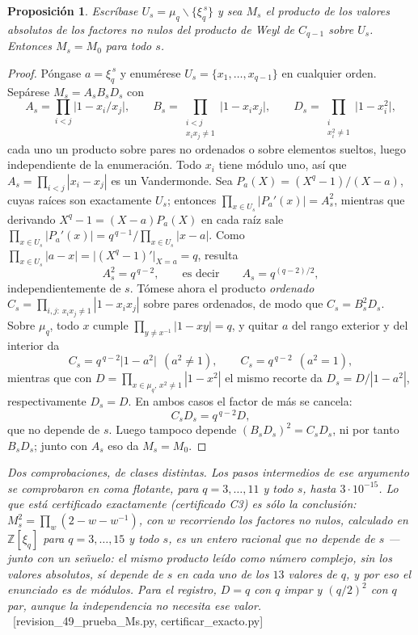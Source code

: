 \documentclass[11pt,a4paper]{article}
\newtheorem{proposition}[theorem]{Proposición}
\newcommand{\ver}[1]{\unskip\penalty0\ \textcolor{azul}{\small\textsf{[#1]}}}
\begin{document}
\begin{proposition}\label{prop:Ms}
Escríbase $U_s=\mu_q\smallsetminus\{\xi_q^{\,s}\}$ y sea $M_s$ el producto de los \emph{valores
absolutos} de los factores no nulos del producto de Weyl de $C_{q-1}$ sobre $U_s$. Entonces
$M_s=M_0$ para todo $s$.
\end{proposition}

\begin{proof}
Póngase $a=\xi_q^{\,s}$ y enumérese $U_s=\{x_1,\dots,x_{q-1}\}$ en cualquier orden. Sepárese
$M_s=A_sB_sD_s$ con
\[
A_s=\prod_{i<j}\big|1-x_i/x_j\big|,\qquad
B_s=\prod_{\substack{i<j\\ x_ix_j\neq1}}\big|1-x_ix_j\big|,\qquad
D_s=\prod_{\substack{i\\ x_i^2\neq1}}\big|1-x_i^2\big| ,
\]
cada uno un producto sobre pares no ordenados o sobre elementos sueltos, luego independiente de la
enumeración. Todo $x_i$ tiene módulo uno, así que $A_s=\prod_{i<j}|x_i-x_j|$ es un Vandermonde. Sea
$P_a(X)=(X^q-1)/(X-a)$, cuyas raíces son exactamente $U_s$; entonces
$\prod_{x\in U_s}|P_a'(x)|=A_s^2$, mientras que derivando $X^q-1=(X-a)P_a(X)$ en cada raíz sale
$\prod_{x\in U_s}|P_a'(x)|=q^{\,q-1}\big/\prod_{x\in U_s}|x-a|$. Como
$\prod_{x\in U_s}|a-x|=\big|(X^q-1)'\big|_{X=a}=q$, resulta
\[
A_s^2=q^{\,q-2},\qquad\text{es decir}\qquad A_s=q^{(q-2)/2},
\]
independientemente de $s$. Tómese ahora el producto \emph{ordenado}
$C_s=\prod_{i,j:\ x_ix_j\neq1}|1-x_ix_j|$ sobre pares ordenados, de modo que $C_s=B_s^2D_s$. Sobre
$\mu_q$, todo $x$ cumple
$\prod_{y\neq x^{-1}}|1-xy|=q$, y quitar $a$ del rango exterior y del interior da
\[
C_s=q^{\,q-2}\big|1-a^2\big|\ \ (a^2\neq1),\qquad C_s=q^{\,q-2}\ \ (a^2=1),
\]
mientras que con $D=\prod_{x\in\mu_q,\,x^2\neq1}|1-x^2|$ el mismo recorte da $D_s=D/|1-a^2|$,
respectivamente $D_s=D$. En ambos casos el factor de más se cancela:
\[
C_sD_s=q^{\,q-2}D ,
\]
que no depende de $s$. Luego tampoco depende $(B_sD_s)^2=C_sD_s$, ni por tanto $B_sD_s$; junto con
$A_s$ eso da $M_s=M_0$.
\end{proof}

\noindent \emph{Dos comprobaciones, de clases distintas. Los pasos intermedios de ese argumento se
comprobaron en coma flotante, para $q=3,\dots,11$ y todo $s$, hasta $3\cdot10^{-15}$. Lo que está
certificado exactamente (certificado C3) es sólo la conclusión: $M_s^2=\prod_w(2-w-w^{-1})$, con $w$
recorriendo los factores no nulos, calculado en $\mathbb{Z}[\xi_q]$ para $q=3,\dots,15$ y todo $s$,
es un entero racional que no depende de $s$ --- junto con un señuelo: el mismo producto leído como
número complejo, sin los valores absolutos, sí depende de $s$ en cada uno de los $13$ valores de
$q$, y por eso el enunciado es de módulos. Para
el registro, $D=q$ con $q$ impar y $(q/2)^2$ con $q$ par, aunque la independencia no necesita ese
valor.} \ver{revision\_49\_prueba\_Ms.py, certificar\_exacto.py}
\end{document}
